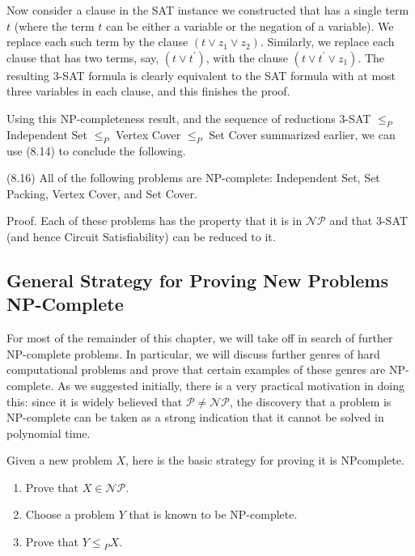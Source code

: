 \documentclass[a4paper, 12pt]{book}
\theoremstyle{dotless}
\begin{document}
Now consider a clause in the SAT instance we constructed that has a single term $t$ (where the term $t$ can be either a variable or the negation of a variable). We replace each such term by the clause $\left(t \vee z_{1} \vee z_{2}\right)$. Similarly, we replace each clause that has two terms, say, $\left(t \vee t^{\prime}\right)$, with the clause $\left(t \vee t^{\prime} \vee z_{1}\right)$. The resulting 3-SAT formula is clearly equivalent to the SAT formula with at most three variables in each clause, and this finishes the proof.

Using this NP-completeness result, and the sequence of reductions 3-SAT $\leq_{P}$ Independent Set $\leq_{P}$ Vertex Cover $\leq_{P}$ Set Cover summarized earlier, we can use (8.14) to conclude the following.

(8.16) All of the following problems are NP-complete: Independent Set, Set Packing, Vertex Cover, and Set Cover.

Proof. Each of these problems has the property that it is in $\mathcal{N} \mathcal{P}$ and that 3-SAT (and hence Circuit Satisfiability) can be reduced to it.

\subsection{General Strategy for Proving New Problems NP-Complete}
For most of the remainder of this chapter, we will take off in search of further NP-complete problems. In particular, we will discuss further genres of hard computational problems and prove that certain examples of these genres are NP-complete. As we suggested initially, there is a very practical motivation in doing this: since it is widely believed that $\mathcal{P} \neq \mathcal{N} \mathcal{P}$, the discovery that a problem is NP-complete can be taken as a strong indication that it cannot be solved in polynomial time.

Given a new problem $X$, here is the basic strategy for proving it is NPcomplete.

\begin{enumerate}
  \item Prove that $X \in \mathcal{N} \mathcal{P}$.

  \item Choose a problem $Y$ that is known to be NP-complete.

  \item Prove that $Y \leq{ }_{P} X$.

\end{enumerate}
\end{document}
